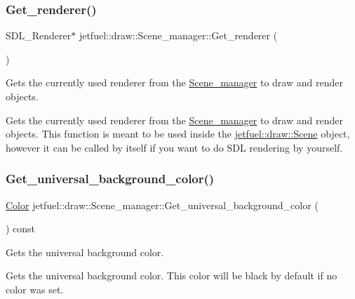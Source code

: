 \subsubsection{\texorpdfstring{Get\+\_\+renderer()}{Get\_renderer()}}
{\footnotesize\ttfamily S\+D\+L\+\_\+\+Renderer$\ast$ jetfuel\+::draw\+::\+Scene\+\_\+manager\+::\+Get\+\_\+renderer (\begin{DoxyParamCaption}{ }\end{DoxyParamCaption})\hspace{0.3cm}{\ttfamily [inline]}}



Gets the currently used renderer from the \hyperlink{classjetfuel_1_1draw_1_1Scene__manager}{Scene\+\_\+manager} to draw and render objects. 

Gets the currently used renderer from the \hyperlink{classjetfuel_1_1draw_1_1Scene__manager}{Scene\+\_\+manager} to draw and render objects. This function is meant to be used inside the \hyperlink{classjetfuel_1_1draw_1_1Scene}{jetfuel\+::draw\+::\+Scene} object, however it can be called by itself if you want to do S\+DL rendering by yourself. \mbox{\label{classjetfuel_1_1draw_1_1Scene__manager_a1f8e3144806b276df030ab9db20fa185}} 
\subsubsection{\texorpdfstring{Get\+\_\+universal\+\_\+background\+\_\+color()}{Get\_universal\_background\_color()}}
{\footnotesize\ttfamily \hyperlink{classjetfuel_1_1draw_1_1Color}{Color} jetfuel\+::draw\+::\+Scene\+\_\+manager\+::\+Get\+\_\+universal\+\_\+background\+\_\+color (\begin{DoxyParamCaption}{ }\end{DoxyParamCaption}) const\hspace{0.3cm}{\ttfamily [inline]}}



Gets the universal background color. 

Gets the universal background color. This color will be black by default if no color was set. \mbox{\label{classjetfuel_1_1draw_1_1Scene__manager_a1758a86d40dcfaface8958fcd33676bf}} 
